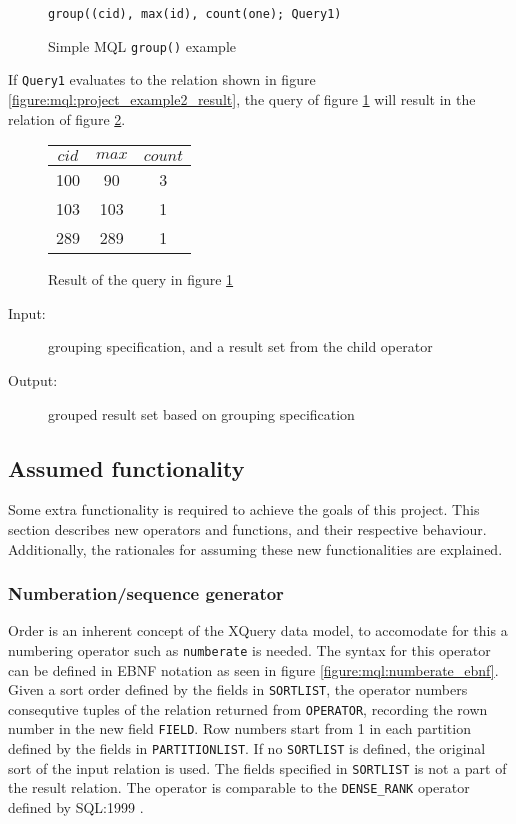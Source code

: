 \begin{figure}[h]
\begin{Verbatim}
group((cid), max(id), count(one); Query1)
\end{Verbatim}
\caption{Simple MQL \texttt{group()} example}
\label{figure:mql:groupEx}
\end{figure}

If \texttt{Query1} evaluates to the relation shown in figure \ref{figure:mql:project_example2_result}, the query
of figure \ref{figure:mql:groupEx} will result in the relation of figure \ref{figure:mql:groupres}.

\begin{figure}[!h]
\centering
\begin{tabular}{|c|c|c|} \hline
$cid$ & $max$ & $count$ \\ \hline
100 & 90 & 3 \\ \hline
103 & 103 & 1 \\ \hline
289 & 289 & 1 \\ \hline
\end{tabular}
\caption{Result of the query in figure \ref{figure:mql:groupEx}}
\label{figure:mql:groupres}
\end{figure}

\begin{description}
  \item[Input:] grouping specification, and a result set from the child operator
  \item[Output:] grouped result set based on grouping specification
\end{description}


\subsection{Assumed functionality}
\label{sect:method:marsAddedOperators}
Some extra functionality is required to achieve the goals of this project. This
section describes new operators and functions, and their respective behaviour.
Additionally, the rationales for assuming these new functionalities are
explained.

\subsubsection{Numberation/sequence generator}
Order is an inherent concept of the XQuery data model, to accomodate for this a numbering operator such as
\texttt{numberate} is needed. The syntax for this operator can be defined in EBNF notation as seen in figure
\ref{figure:mql:numberate_ebnf}. Given a sort order defined by the fields in \texttt{SORTLIST}, the operator
numbers consequtive tuples of the relation returned from \texttt{OPERATOR}, recording the rown number in the new
field \texttt{FIELD}. Row numbers start from 1 in each partition defined by the fields in \texttt{PARTITIONLIST}.
If no \texttt{SORTLIST} is defined, the original sort of the input relation is used. The fields specified in
\texttt{SORTLIST} is not a part of the result relation. The operator is comparable to the \texttt{DENSE\_RANK}
operator defined by SQL:1999 \cite{sqlbook}.

